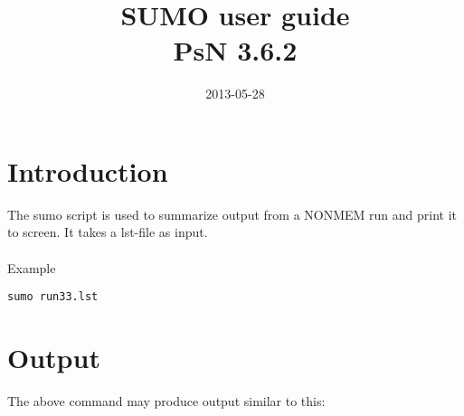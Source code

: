 \documentclass[a4paper,12pt]{article}
\title{SUMO user guide\\ \vspace{2 mm} {\large PsN 3.6.2}}
\date{2013-05-28}
\begin{document}
\maketitle


\section{Introduction}
The sumo script is used to summarize output from a NONMEM run and print it to screen. It takes a lst-file as input.
\\
\\
Example
\begin{verbatim}
sumo run33.lst
\end{verbatim}


\section{Output}

The above command may produce output similar to this:
\end{document}
